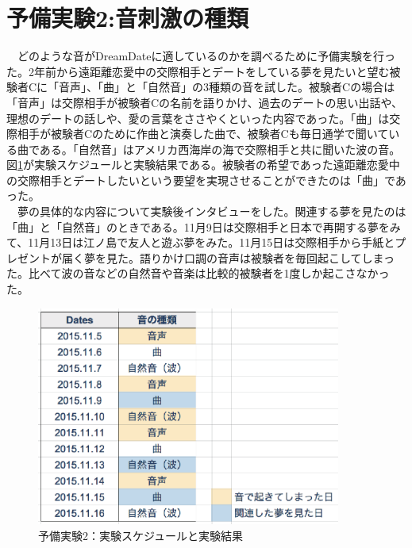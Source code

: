 \section{予備実験2:音刺激の種類}
　どのような音がDreamDateに適しているのかを調べるために予備実験を行った。2年前から遠距離恋愛中の交際相手とデートをしている夢を見たいと望む被験者Cに「音声」、「曲」と「自然音」の3種類の音を試した。被験者Cの場合は「音声」は交際相手が被験者Cの名前を語りかけ、過去のデートの思い出話や、理想のデートの話しや、愛の言葉をささやくといった内容であった。「曲」は交際相手が被験者Cのために作曲と演奏した曲で、被験者Cも毎日通学で聞いている曲である。「自然音」はアメリカ西海岸の海で交際相手と共に聞いた波の音。図\ref{experiment2}が実験スケジュールと実験結果である。被験者の希望であった遠距離恋愛中の交際相手とデートしたいという要望を実現させることができたのは「曲」であった。\\
　夢の具体的な内容について実験後インタビューをした。関連する夢を見たのは「曲」と「自然音」のときである。11月9日は交際相手と日本で再開する夢をみて、11月13日は江ノ島で友人と遊ぶ夢をみた。11月15日は交際相手から手紙とプレゼントが届く夢を見た。語りかけ口調の音声は被験者を毎回起こしてしまった。比べて波の音などの自然音や音楽は比較的被験者を1度しか起こさなかった。

\begin{figure}[htbp]
\begin{center}
\includegraphics[width=10cm]{eps/schedule1.eps}
\caption{予備実験2：実験スケジュールと実験結果}
\label{experiment2}
\end{center}
\end{figure}

